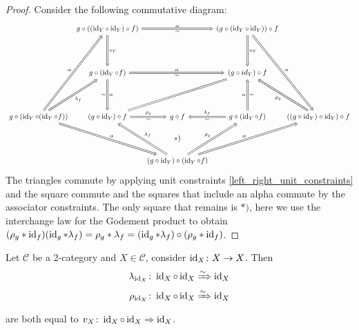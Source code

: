 \begin{proof}
	Consider the following commutative diagram:
	\[
	\begin{tikzcd}[column sep= 0.1cm, row sep= 1.5cm]
		& 
		g \circ ( ( \id_Y \circ \id_Y ) \circ f )
		\ar[rr, Rightarrow, "\alpha", "\sim"']
		\ar[d, Rightarrow, "v_Y"]
		&&
		( g \circ ( \id_Y \circ \id_Y ) ) \circ f 
		\ar[d, Rightarrow, "u_Y" ]
		\ar[rdd, Rightarrow, "\alpha"]
		\\
		&
		g \circ ( \id_Y \circ f )
		\ar[rr,Rightarrow, "\alpha", "\sim"']
		\ar[d, Rightarrow, "\alpha", "\sim"']
		&&
		( g \circ id_Y ) \circ f
		\\
		g \circ ( \id_Y \circ ( \id_Y \circ f ))
		\ar[ruu, Rightarrow, "\alpha"]
		\ar[ru, Rightarrow, "\lambda_f"']
		\ar[rrd, Rightarrow, "\alpha"]
		& 
		( g \circ \id_Y ) \circ f
		\ar[rru, equal]
		\ar[r, Rightarrow ,"\rho_g", " \sim"']
		&
		g \circ f 
		&
		g \circ ( \id_Y \circ f )
		\ar[ u , Rightarrow, "\alpha" , "\sim"']
		\ar[l, Rightarrow, "\lambda_f"' , "\sim"]
		&
		((g \circ \id_Y ) \circ \id_Y ) \circ f
		\ar[lu, Rightarrow, " \rho_g"]
		\\
		&&
		(g \circ \id_Y ) \circ ( \id_Y \circ f)
		\ar[lu, Rightarrow, " \lambda_f"']
		\ar[ru, Rightarrow, "\rho_g"]
		\ar[rru, Rightarrow, " \alpha"]
		\ar[u, phantom, "{*)}"]
	\end{tikzcd}
	\]
	The triangles commute by applying unit constraints  \ref{left_right_unit_constraints} and the square commute 
	and the squares that include an alpha commute by the associator constraints. 
	The only square that remains is $ *) $, here we use the interchange law for the Godement product to obtain $ ( \rho_g * \operatorname{id}_{f} ) ( \operatorname{id}_{g} * \lambda_f ) = \rho_g * \lambda_f = ( \operatorname{id}_{g} * \lambda_f ) \circ ( \rho_g * \operatorname{id}_f )$.
\end{proof}

\begin{cor}
	Let $ \mathcal{ C } $ be a 2-category and $ X \in \mathcal{ C }$, consider $ \operatorname{id}_X \colon X \to X $.
	Then 
	\begin{align*}
			\lambda_{ \operatorname{id}_X} \colon \operatorname{id}_X \circ \operatorname{id}_X 
			&\xRightarrow{\sim }
			\operatorname{id}_X
			\\
			\rho_{ \operatorname{id}_X} \colon \operatorname{id}_X \circ \operatorname{id}_X
			&\xRightarrow{\sim}
			\operatorname{id}_X
	\end{align*} 
	are both equal to $v_X \colon \operatorname{id}_X \circ \operatorname{id}_X \Rightarrow \operatorname{id}_X$.
\end{cor}

